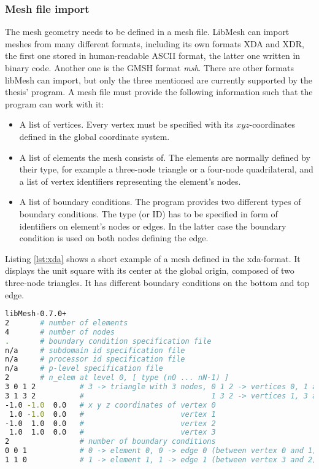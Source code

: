   \subsubsection{Mesh file import}\label{sec:Impl-Details-MeshFileImport}
   The mesh geometry needs to be defined in a mesh file. LibMesh can import meshes from many different formats, including its own formats XDA and XDR, the first one stored in human-readable ASCII format, the latter one written in binary code. Another one is the GMSH format \textit{msh}. There are other formats libMesh can import, but only the three mentioned are currently supported by the thesis' program. A mesh file must provide the following information such that the program can work with it:
   \begin{itemize}
   	\item A list of vertices. Every vertex must be specified with its $xyz$-coordinates defined in the global coordinate system.
   	\item A list of elements the mesh consists of. The elements are normally defined by their type, for example a three-node triangle or a four-node quadrilateral, and a list of vertex identifiers representing the element's nodes.
   	\item A list of boundary conditions. The program provides two different types of boundary conditions. The type (or ID) has to be specified in form of identifiers on element's nodes or edges. In the latter case the boundary condition is used on both nodes defining the edge.
   \end{itemize}
   Listing \ref{lst:xda} shows a short example of a mesh defined in the xda-format. It displays the unit square with its center at the global origin, composed of two three-node triangles. It has different boundary conditions on the bottom and top edge.
\begin{lstlisting}[caption=Example xda mesh file,label=lst:xda,language=bash,keepspaces=true]
libMesh-0.7.0+
2       # number of elements
4       # number of nodes
.       # boundary condition specification file
n/a     # subdomain id specification file
n/a     # processor id specification file
n/a     # p-level specification file
2       # n_elem at level 0, [ type (n0 ... nN-1) ]
3 0 1 2          # 3 -> triangle with 3 nodes, 0 1 2 -> vertices 0, 1 and 2
3 1 3 2          #                             1 3 2 -> vertices 1, 3 and 2
-1.0 -1.0  0.0   # x y z coordinates of vertex 0
 1.0 -1.0  0.0   #                      vertex 1
-1.0  1.0  0.0   #                      vertex 2
 1.0  1.0  0.0   #                      vertex 3
2                # number of boundary conditions
0 0 1            # 0 -> element 0, 0 -> edge 0 (between vertex 0 and 1), bc-type 1
1 1 0            # 1 -> element 1, 1 -> edge 1 (between vertex 3 and 2), bc-type 0
\end{lstlisting}
